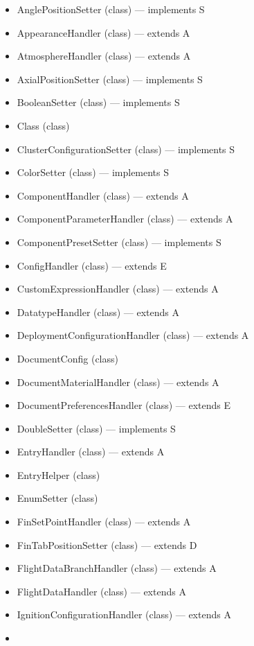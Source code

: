 \documentclass{amsdtx}
\begin{document}
\begin{itemize}
\begin{itemize}
\begin{itemize}
    \item
      AnglePositionSetter (class) --- implements S
    \item
      AppearanceHandler (class) --- extends A
    \item
      AtmosphereHandler (class) --- extends A
    \item
      AxialPositionSetter (class) --- implements S
    \item
      BooleanSetter (class) --- implements S
    \item
      Class (class)
    \item
      ClusterConfigurationSetter (class) --- implements S
    \item
      ColorSetter (class) --- implements S
    \item
      ComponentHandler (class) --- extends A
    \item
      ComponentParameterHandler (class) --- extends A
    \item
      ComponentPresetSetter (class) --- implements S
    \item
      ConfigHandler (class) --- extends E
    \item
      CustomExpressionHandler (class) --- extends A
    \item
      DatatypeHandler (class) --- extends A
    \item
      DeploymentConfigurationHandler (class) --- extends A
    \item
      DocumentConfig (class)
    \item
      DocumentMaterialHandler (class) --- extends A
    \item
      DocumentPreferencesHandler (class) --- extends E
    \item
      DoubleSetter (class) --- implements S
    \item
      EntryHandler (class) --- extends A
    \item
      EntryHelper (class)
    \item
      EnumSetter (class)
    \item
      FinSetPointHandler (class) --- extends A
    \item
      FinTabPositionSetter (class) --- extends D
    \item
      FlightDataBranchHandler (class) --- extends A
    \item
      FlightDataHandler (class) --- extends A
    \item
      IgnitionConfigurationHandler (class) --- extends A
    \item

\end{itemize}
\end{itemize}
\end{itemize}
\end{document}

